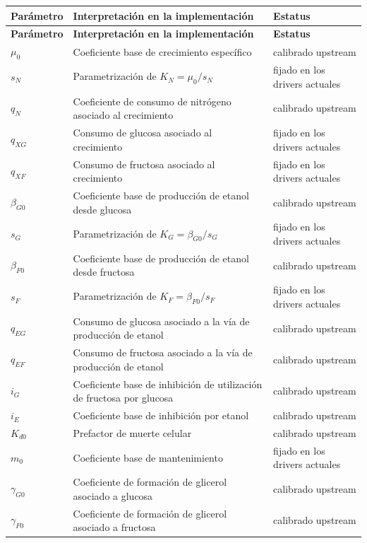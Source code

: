 \documentclass[11pt,a4paper]{article}
\begin{document}
\begin{longtable}{p{2.6cm}p{8.4cm}p{3.0cm}}
\toprule
\textbf{Parámetro} & \textbf{Interpretación en la implementación} & \textbf{Estatus}\\
\midrule
\endfirsthead
\toprule
\textbf{Parámetro} & \textbf{Interpretación en la implementación} & \textbf{Estatus}\\
\midrule
\endhead
$\mu_0$ & Coeficiente base de crecimiento específico & calibrado upstream\\
$s_N$ & Parametrización de $K_N=\mu_0/s_N$ & fijado en los drivers actuales\\
$q_N$ & Coeficiente de consumo de nitrógeno asociado al crecimiento & calibrado upstream\\
$q_{XG}$ & Consumo de glucosa asociado al crecimiento & fijado en los drivers actuales\\
$q_{XF}$ & Consumo de fructosa asociado al crecimiento & fijado en los drivers actuales\\
$\beta_{G0}$ & Coeficiente base de producción de etanol desde glucosa & calibrado upstream\\
$s_G$ & Parametrización de $K_G=\beta_{G0}/s_G$ & fijado en los drivers actuales\\
$\beta_{F0}$ & Coeficiente base de producción de etanol desde fructosa & calibrado upstream\\
$s_F$ & Parametrización de $K_F=\beta_{F0}/s_F$ & fijado en los drivers actuales\\
$q_{EG}$ & Consumo de glucosa asociado a la vía de producción de etanol & calibrado upstream\\
$q_{EF}$ & Consumo de fructosa asociado a la vía de producción de etanol & calibrado upstream\\
$i_G$ & Coeficiente base de inhibición de utilización de fructosa por glucosa & calibrado upstream\\
$i_E$ & Coeficiente base de inhibición por etanol & calibrado upstream\\
$K_{d0}$ & Prefactor de muerte celular & calibrado upstream\\
$m_0$ & Coeficiente base de mantenimiento & fijado en los drivers actuales\\
$\gamma_{G0}$ & Coeficiente de formación de glicerol asociado a glucosa & calibrado upstream\\
$\gamma_{F0}$ & Coeficiente de formación de glicerol asociado a fructosa & calibrado upstream\\
\bottomrule
\end{longtable}
\end{document}
